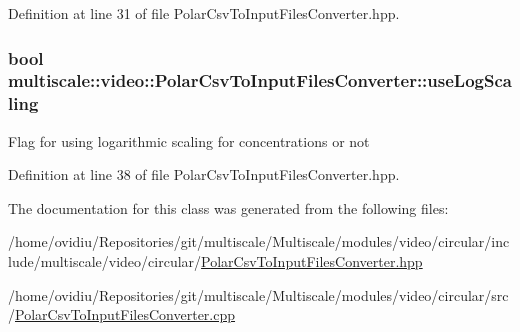 Definition at line 31 of file Polar\-Csv\-To\-Input\-Files\-Converter.\-hpp.

\hypertarget{classmultiscale_1_1video_1_1PolarCsvToInputFilesConverter_af07bf56fc39bb226a6e2596f35ada0d7}{
\subsubsection[{use\-Log\-Scaling}]{\setlength{\rightskip}{0pt plus 5cm}bool multiscale\-::video\-::\-Polar\-Csv\-To\-Input\-Files\-Converter\-::use\-Log\-Scaling\hspace{0.3cm}{\ttfamily [private]}}}\label{classmultiscale_1_1video_1_1PolarCsvToInputFilesConverter_af07bf56fc39bb226a6e2596f35ada0d7}
Flag for using logarithmic scaling for concentrations or not 

Definition at line 38 of file Polar\-Csv\-To\-Input\-Files\-Converter.\-hpp.



The documentation for this class was generated from the following files\-:\begin{DoxyCompactItemize}
\item 
/home/ovidiu/\-Repositories/git/multiscale/\-Multiscale/modules/video/circular/include/multiscale/video/circular/\hyperlink{PolarCsvToInputFilesConverter_8hpp}{Polar\-Csv\-To\-Input\-Files\-Converter.\-hpp}\item 
/home/ovidiu/\-Repositories/git/multiscale/\-Multiscale/modules/video/circular/src/\hyperlink{PolarCsvToInputFilesConverter_8cpp}{Polar\-Csv\-To\-Input\-Files\-Converter.\-cpp}\end{DoxyCompactItemize}
